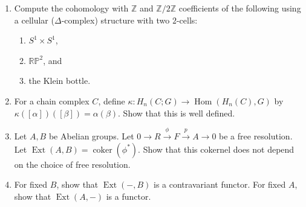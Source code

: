 \documentclass[11pt]{article}
\DeclareMathOperator{\coker}{coker}
\DeclareMathOperator{\Hom}{Hom}
\DeclareMathOperator{\Ext}{Ext}
\begin{document}
\begin{enumerate}
    \item Compute the cohomology with $\mathbb{Z}$ and $\mathbb{Z}/2\mathbb{Z}$ coefficients of the following using a
    cellular ($\Delta$-complex) structure with two $2$-cells: \begin{enumerate}
      \item $S^1 \times S^1$,
      \item $\mathbb{RP}^2$, and
      \item the Klein bottle.
    \end{enumerate}
    \item For a chain complex $C$, define $\kappa : H_n(C; G) \to \Hom(H_n(C),G)$ by $\kappa([\alpha])([\beta]) = \alpha(\beta)$. Show that this is well defined.
    \item Let $A,B$ be Abelian groups. Let $0 \to R \xrightarrow{\phi} F \xrightarrow{p} A \to 0$ be a free resolution. Let $\Ext(A,B) = \coker(\phi^\ast)$. Show that this cokernel does not depend on the choice of free resolution.
    \item For fixed $B$, show that $\Ext(-,B)$ is a contravariant functor. For fixed $A$, show that $\Ext(A,-)$ is a functor.
\end{enumerate}
\end{document}
